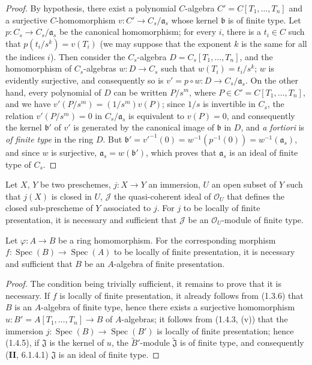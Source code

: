 \begin{proof}
By hypothesis, there exist a polynomial $C$-algebra
$C'=C[T_1,\ldots,T_n]$ and a surjective $C$-homomorphism
$v:C'\to C_s/\mathfrak a_s$ whose kernel $\mathfrak b$ is of finite type.
Let $p:C_s\to C_s/\mathfrak a_s$ be the canonical homomorphism; for every $i$,
there is a $t_i\in C$ such that $p(t_i/s^k)=v(T_i)$ (we may suppose that
the exponent $k$ is the same for all the indices $i$). Then consider the
$C_s$-algebra $D=C_s[T_1,\ldots,T_n]$, and the homomorphism of $C_s$-algebras
$w:D\to C_s$ such that $w(T_i)=t_i/s^k$; $w$ is evidently surjective, and
consequently so is $v'=p\circ w:D\to C_s/\mathfrak a_s$. On the other
hand, every polynomial of $D$ can be written $P/s^m$, where
$P\in C'=C[T_1,\ldots,T_n]$, and we have
$v'(P/s^m)=(1/s^m)v(P)$; since $1/s$ is invertible in $C_s$, the relation
$v'(P/s^m)=0$ in $C_s/\mathfrak a_s$ is equivalent to $v(P)=0$, and
consequently the kernel $\mathfrak b'$ of $v'$ is generated by the canonical
image of $\mathfrak b$ in $D$, and \emph{a fortiori} is \emph{of finite type} in the
ring $D$. But
$\mathfrak b'=v'^{-1}(0)=w^{-1}(p^{-1}(0))=w^{-1}(\mathfrak a_s)$, and since
$w$ is surjective, $\mathfrak a_s=w(\mathfrak b')$, which proves that
$\mathfrak a_s$ is an ideal of finite type of $C_s$.
\end{proof}

\begin{corollary}[1.4.5]
\label{IV.1.4.5}
Let $X$, $Y$ be two preschemes, $j:X\to Y$ an immersion, $U$ an open subset
of $Y$ such that $j(X)$ is closed in $U$, $\mathcal J$ the quasi-coherent
ideal of $\mathcal O_U$ that defines the closed sub-prescheme of $Y$
associated to $j$. For $j$ to be locally of finite presentation, it is
necessary and sufficient that $\mathcal J$ be an $\mathcal O_U$-module of
finite type.
\end{corollary}

\par\medskip\noindent
\begin{proposition}[1.4.6]
\label{IV.1.4.6}
Let $\varphi:A\to B$ be a ring homomorphism. For the corresponding
morphism $f:\operatorname{Spec}(B)\to\operatorname{Spec}(A)$ to be locally of finite presentation,
it is necessary and sufficient that $B$ be an $A$-algebra of finite
presentation.
\end{proposition}

\begin{proof}
The condition being trivially sufficient, it remains to prove that it is
necessary. If $f$ is locally of finite presentation, it already follows from
(1.3.6) that $B$ is an $A$-algebra of finite type, hence there exists a
surjective homomorphism $u:B'=A[T_1,\ldots,T_n]\to B$ of $A$-algebras; it
follows from (1.4.3, (v)) that the immersion
$j:\operatorname{Spec}(B)\to\operatorname{Spec}(B')$ is locally
of finite presentation; hence (1.4.5), if $\mathfrak J$ is the kernel of $u$,
the $\widetilde{B}'$-module $\widetilde{\mathfrak J}$ is of finite type, and
consequently (\textbf{II}, 6.1.4.1) $\mathfrak J$ is an ideal of finite type.
\end{proof}

